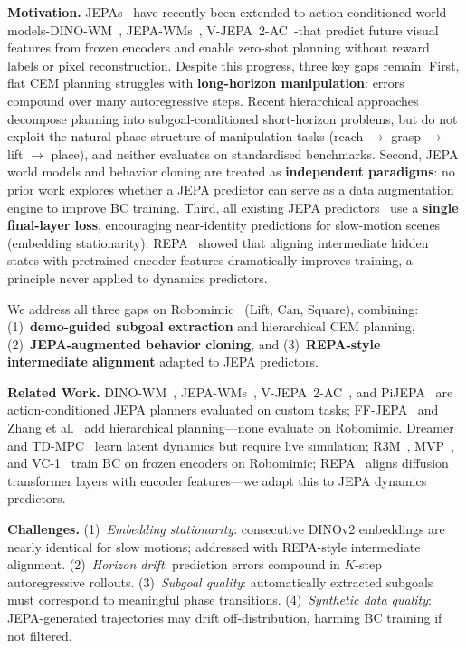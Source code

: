 \documentclass[10pt,twocolumn,letterpaper]{article}
\begin{document}
\noindent\textbf{Motivation.}
JEPAs~\cite{ijepa} have recently been extended to action-conditioned world models-DINO-WM~\cite{dino_wm}, JEPA-WMs~\cite{jepawms}, V-JEPA~2-AC~\cite{vjepa2}-that predict future visual features from frozen encoders and enable zero-shot planning without reward labels or pixel reconstruction.
Despite this progress, three key gaps remain.
First, flat CEM planning struggles with \textbf{long-horizon manipulation}: errors compound over many autoregressive steps.
Recent hierarchical approaches~\cite{ffjepa,zhang2026hierarchical} decompose planning into subgoal-conditioned short-horizon problems, but do not exploit the natural phase structure of manipulation tasks (reach $\to$ grasp $\to$ lift $\to$ place), and neither evaluates on standardised benchmarks.
Second, JEPA world models and behavior cloning are treated as \textbf{independent paradigms}: no prior work explores whether a JEPA predictor can serve as a data augmentation engine to improve BC training.
Third, all existing JEPA predictors~\cite{ijepa,vjepa,mcjepa} use a \textbf{single final-layer loss}, encouraging near-identity predictions for slow-motion scenes (embedding stationarity).
REPA~\cite{repa} showed that aligning intermediate hidden states with pretrained encoder features dramatically improves training, a principle never applied to dynamics predictors.

We address all three gaps on Robomimic~\cite{robomimic2021} (Lift, Can, Square), combining: (1)~\textbf{demo-guided subgoal extraction} and hierarchical CEM planning, (2)~\textbf{JEPA-augmented behavior cloning}, and (3)~\textbf{REPA-style intermediate alignment} adapted to JEPA predictors.

\noindent\textbf{Related Work.}
DINO-WM~\cite{dino_wm}, JEPA-WMs~\cite{jepawms}, V-JEPA~2-AC~\cite{vjepa2}, and PiJEPA~\cite{pijepa} are action-conditioned JEPA planners evaluated on custom tasks; FF-JEPA~\cite{ffjepa} and Zhang et al.~\cite{zhang2026hierarchical} add hierarchical planning---none evaluate on Robomimic.
Dreamer~\cite{dreamer} and TD-MPC~\cite{tdmpc} learn latent dynamics but require live simulation; R3M~\cite{r3m}, MVP~\cite{mvp}, and VC-1~\cite{vc1} train BC on frozen encoders on Robomimic; REPA~\cite{repa} aligns diffusion transformer layers with encoder features---we adapt this to JEPA dynamics predictors.

\noindent\textbf{Challenges.}
(1)~\emph{Embedding stationarity}: consecutive DINOv2 embeddings are nearly identical for slow motions; addressed with REPA-style intermediate alignment.
(2)~\emph{Horizon drift}: prediction errors compound in $K$-step autoregressive rollouts.
(3)~\emph{Subgoal quality}: automatically extracted subgoals must correspond to meaningful phase transitions.
(4)~\emph{Synthetic data quality}: JEPA-generated trajectories may drift off-distribution, harming BC training if not filtered.
\end{document}
